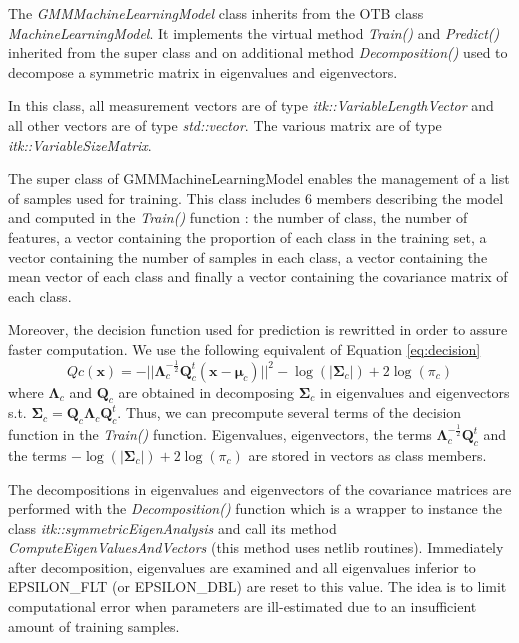 \documentclass[a4paper]{article}
\begin{document}
        The \emph{GMMMachineLearningModel} class inherits from the OTB class \emph{MachineLearningModel}. It implements the virtual method \emph{Train()} and \emph{Predict()} inherited from the super class and on additional method \emph{Decomposition()} used to decompose a symmetric matrix in eigenvalues and eigenvectors.

        In this class, all measurement vectors are of type \emph{itk::VariableLengthVector} and all other vectors are of type \emph{std::vector}. The various matrix are of type \emph{itk::VariableSizeMatrix}.

        The super class of GMMMachineLearningModel enables the management of a list of samples used for training. This class includes 6 members describing the model and computed in the \emph{Train()} function : the number of class, the number of features, a vector containing the proportion of each class in the training set, a vector containing the number of samples in each class, a vector containing the mean vector of each class and finally a vector containing the covariance matrix of each class.

        Moreover, the decision function used for prediction is rewritted in order to assure faster computation. We use the following equivalent of Equation \ref{eq:decision}
        \begin{equation}
            Qc(\mathbf{x}) = -  || \boldsymbol{\Lambda}_c^{-\frac{1}{2}} \boldsymbol{Q}_c^t (\mathbf{x} - \boldsymbol{\mu}_c) ||^2 - \log (|\boldsymbol{\Sigma}_c|) + 2 \log (\pi_c)
        \end{equation}
        where $\boldsymbol{\Lambda}_c$ and $\boldsymbol{Q}_c$ are obtained in decomposing $\boldsymbol{\Sigma}_c$ in eigenvalues and eigenvectors s.t. $\boldsymbol{\Sigma}_c = \boldsymbol{Q}_c \boldsymbol{\Lambda}_c \boldsymbol{Q}_c^t$. Thus, we can precompute several terms of the decision function in the \emph{Train()} function. Eigenvalues, eigenvectors, the terms $\boldsymbol{\Lambda}_c^{-\frac{1}{2}} \boldsymbol{Q}_c^t$ and the terms $- \log (|\boldsymbol{\Sigma}_c|) + 2 \log (\pi_c)$ are stored in vectors as class members.

        The decompositions in eigenvalues and eigenvectors of the covariance matrices are performed with the \emph{Decomposition()} function which is a wrapper to instance the class \emph{itk::symmetricEigenAnalysis} and call its method \emph{ComputeEigenValuesAndVectors} (this method uses netlib routines). Immediately after decomposition, eigenvalues are examined and all eigenvalues inferior to EPSILON\_FLT (or EPSILON\_DBL) are reset to this value. The idea is to limit computational error when parameters are ill-estimated due to an insufficient amount of training samples.
\end{document}
